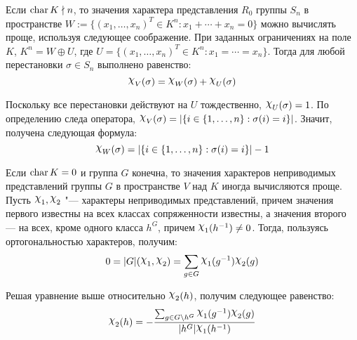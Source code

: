 \begin{note}
	Если $\operatorname{char}{K} \nmid n$, то значения характера представления $R_0$ группы $S_n$ в пространстве $W := \{(x_1, \dotsc, x_n)^T \in K^n : x_1 + \dotsb + x_n = 0\}$ можно вычислять проще, используя следующее соображение. При заданных ограничениях на поле $K$, $K^n = W \oplus U$, где $U = \{(x_1, \dotsc, x_n)^T \in K^n : x_1 = \dotsb = x_n\}$. Тогда для любой перестановки $\sigma \in S_n$ выполнено равенство:
	\[\Chi_{V}(\sigma) = \Chi_W(\sigma) + \Chi_U(\sigma)\]
	
	Поскольку все перестановки действуют на $U$ тождественно, $\Chi_U(\sigma) = 1$. По определению следа оператора, $\Chi_V(\sigma) = |\{i \in \{1, \dotsc, n\} : \sigma(i) = i\}|$. Значит, получена следующая формула:
	\[\Chi_W(\sigma) = |\{i \in \{1, \dotsc, n\} : \sigma(i) = i\}| - 1\]
\end{note}

\begin{note}
	Если $\operatorname{char}{K} = 0$ и группа $G$ конечна, то значения характеров неприводимых представлений группы $G$ в пространстве $V$ над $K$ иногда вычисляются проще. Пусть $\Chi_1, \Chi_2$ "--- характеры неприводимых представлений, причем значения первого известны на всех классах сопряженности известны, а значения второго --- на всех, кроме одного класса $h^G$, причем $\Chi_1(h^{-1}) \ne 0$. Тогда, пользуясь ортогональностью характеров, получим:
	\[0 = |G|(\Chi_1, \Chi_2) = \sum_{g \in G}\Chi_1(g^{-1})\Chi_2(g)\]
	
	Решая уравнение выше относительно $\Chi_2(h)$, получим следующее равенство:
	\[\Chi_2(h) = -\frac{\sum_{g \in G \bs h^G}\Chi_1(g^{-1})\Chi_2(g)}{|h^G|\Chi_1(h^{-1})}\]
\end{note}